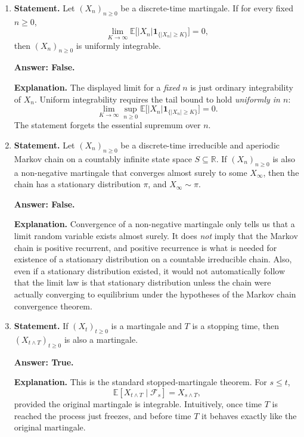 \documentclass[11pt]{article}
\theoremstyle{definition}
\begin{document}
\begin{enumerate}[label=(\arabic*)]
    \item \textbf{Statement.} Let \((X_n)_{n\ge 0}\) be a discrete-time martingale. If for every fixed \(n\ge 0\),
    \[
    \lim_{K\to\infty}\mathbb E\bigl[|X_n|\mathbf 1_{\{|X_n|\ge K\}}\bigr]=0,
    \]
    then \((X_n)_{n\ge 0}\) is uniformly integrable.

    \textbf{Answer: False.}

    \textbf{Explanation.} The displayed limit for a \emph{fixed} \(n\) is just ordinary integrability of \(X_n\). Uniform integrability requires the tail bound to hold \emph{uniformly in \(n\)}:
    \[
    \lim_{K\to\infty} \sup_{n\ge 0}
    \mathbb E\bigl[|X_n|\mathbf 1_{\{|X_n|\ge K\}}\bigr]=0.
    \]
    The statement forgets the essential supremum over \(n\).

    \item \textbf{Statement.} Let \((X_n)_{n\ge 0}\) be a discrete-time irreducible and aperiodic Markov chain on a countably infinite state space \(S\subseteq \mathbb R\). If \((X_n)_{n\ge 0}\) is also a non-negative martingale that converges almost surely to some \(X_\infty\), then the chain has a stationary distribution \(\pi\), and \(X_\infty\sim \pi\).

    \textbf{Answer: False.}

    \textbf{Explanation.} Convergence of a non-negative martingale only tells us that a limit random variable exists almost surely. It does \emph{not} imply that the Markov chain is positive recurrent, and positive recurrence is what is needed for existence of a stationary distribution on a countable irreducible chain. Also, even if a stationary distribution existed, it would not automatically follow that the limit law is that stationary distribution unless the chain were actually converging to equilibrium under the hypotheses of the Markov chain convergence theorem.

    \item \textbf{Statement.} If \((X_t)_{t\ge 0}\) is a martingale and \(T\) is a stopping time, then \((X_{t\wedge T})_{t\ge 0}\) is also a martingale.

    \textbf{Answer: True.}

    \textbf{Explanation.} This is the standard stopped-martingale theorem. For \(s\le t\),
    \[
    \mathbb E[X_{t\wedge T}\mid \mathcal F_s]=X_{s\wedge T},
    \]
    provided the original martingale is integrable. Intuitively, once time \(T\) is reached the process just freezes, and before time \(T\) it behaves exactly like the original martingale.


\end{enumerate}
\end{document}
